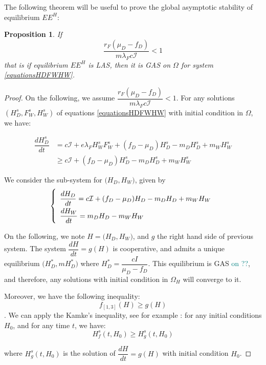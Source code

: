 \documentclass{article}
\newcommand{\lfw}{\lambda_{F}}
\newcommand{\lfw}{\lambda_{F}}
\newcommand{\marc}[1]{\textcolor{teal}{#1}}
\newtheorem{prop}{Proposition}
\begin{document}
The following theorem will be useful to prove the global asymptotic stability of equilibrium $EE^{H}$:

\begin{prop}
If $$\dfrac{r_F(\mu_D-f_D)}{m\lfw c\mathcal{I}} < 1$$
that is if equilibrium $EE^{H}$ is LAS, then it is GAS on $\Omega$ for system \eqref{equationsHDFWHW}.
\end{prop}

\begin{proof}
On the following, we assume $\dfrac{r_F(\mu_D-f_D)}{m\lfw c\mathcal{I}} < 1$. For any solutions $(H_D^s, F_W^s, H_W^s)$ of equations \eqref{equationsHDFWHW} with initial condition in $\Omega$, we have:

\begin{align*}
\dfrac{dH_D^s}{dt} &= c\mathcal{I} + e\lfw H_W^s F_W^s + (f_D - \mu_D) H_D^s - m_D H_D^s + m_W H_W^s \\
&\geq c\mathcal{I} + (f_D - \mu_D) H_D^s - m_D H_D^s + m_W H_W^s
\end{align*}

We consider the sub-system for $\Big(H_D, H_W\Big)$, given by
\begin{equation}
\def\arraystretch{2}
\left\{ \begin{array}{l}
\dfrac{dH_D}{dt}= c\mathcal{I} + (f_D - \mu_D) H_D- m_D H_D + m_W H_W \\
\dfrac{dH_W}{dt}= m_D H_D - m_W H_W 
\end{array}\right.
\label{limitSystem - eqH}
\end{equation}

On the following, we note $H = \Big(H_D, H_W\Big)$, and $g$ the right hand side of previous system. The system $\dfrac{dH}{dt} = g(H)$ is cooperative, and admits a unique equilibrium $\Big(H_D^*, mH_D^*\Big)$ where $H_D^* = \dfrac{cI}{\mu_D - f_D}$. This equilibrium is GAS \marc{on ??}, and therefore, any solutions with initial condition in $\Omega_H$ will converge to it.



Moreover, we have the following inequality: $$f_{[1,3]}(H) \geq g(H)$$. We can apply the Kamke's inequality, see for example \cite{kirkilionis_comparison_2004}: for any initial conditions $H_0$, and for any time $t$, we have:
\begin{equation}
H_f^s(t, H_0) \geq H_g^s(t, H_0)
\label{inequalitySolution - eqH}
\end{equation}

where $H_g^s(t, H_0)$ is the solution of $\dfrac{dH}{dt} = g(H)$ with initial condition $H_0$.


\end{proof}
\end{document}
